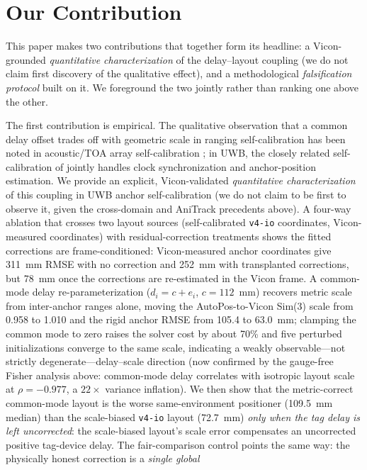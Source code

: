 \documentclass[11pt,a4paper]{article}
\begin{document}
\section{Our Contribution}

This paper makes two contributions that together form its headline: a Vicon-grounded
\emph{quantitative characterization} of the delay--layout coupling (we do not claim first
discovery of the qualitative effect), and a methodological \emph{falsification protocol} built on
it. We foreground the two jointly rather than ranking one above the other.

The first contribution is empirical. The qualitative observation that a common
delay offset trades off with geometric scale in ranging self-calibration has been
noted in acoustic/TOA array self-calibration \citep{burgess_2015_toa_self_calibration}; in UWB, the
closely related self-calibration of \citet{hamer_2018_self_calibrating_ultra_wideband_network} jointly
handles clock synchronization and anchor-position estimation. We provide
an explicit, Vicon-validated \emph{quantitative characterization} of this coupling in
UWB anchor self-calibration (we do not claim to be first to observe it, given the
cross-domain and AniTrack precedents above). A four-way ablation that crosses two layout sources (self-calibrated
\texttt{v4-io} coordinates, Vicon-measured coordinates) with residual-correction
treatments shows the fitted corrections are frame-conditioned: Vicon-measured anchor
coordinates give 311~mm RMSE with no correction and 252~mm with transplanted corrections,
but 78~mm once the corrections are re-estimated in the Vicon frame. A common-mode delay
re-parameterization ($d_i = c + e_i$, $c = 112$~mm) recovers metric scale from
inter-anchor ranges alone, moving the AutoPos-to-Vicon Sim(3) scale from 0.958 to 1.010
and the rigid anchor RMSE from 105.4 to 63.0~mm; clamping the common mode to zero raises
the solver cost by about 70\% and five perturbed initializations converge to the same
scale, indicating a weakly observable---not strictly degenerate---delay--scale
direction (now confirmed by the gauge-free Fisher analysis above: common-mode delay
correlates with isotropic layout scale at $\rho=-0.977$, a $22\times$ variance inflation).
We then show that the metric-correct common-mode layout is the worse same-environment
positioner (109.5~mm median) than the scale-biased \texttt{v4-io} layout (72.7~mm)
\emph{only when the tag delay is left uncorrected}: the scale-biased layout's scale error
compensates an uncorrected positive tag-device delay. The fair-comparison control points the same way: the physically honest correction is a \emph{single global}
\end{document}
